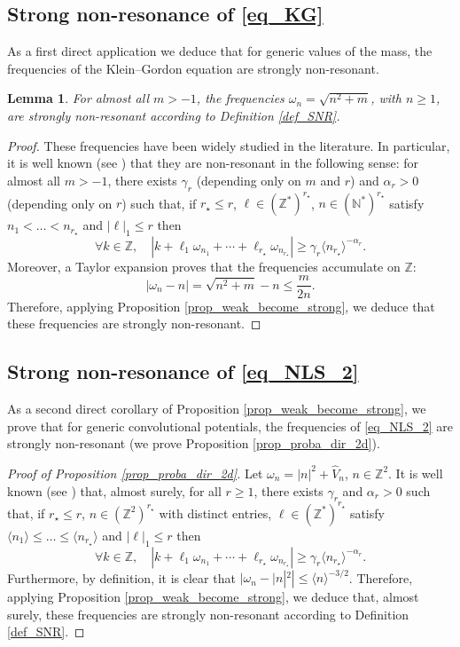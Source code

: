 \documentclass[JEP,XML,SOM,Unicode,NoEqCountersInSection,published]{cedram}
\newtheorem{lemma}[theorem]{Lemma}
\theoremstyle{definition}
\begin{document}
\subsection{Strong non-resonance of \eqref{eq_KG}}
As a first direct application we deduce that for generic values of the mass, the frequencies of the Klein--Gordon equation are strongly non-resonant.
\begin{lemma} \label{lem_nr_KG} For almost all $m>-1$, the frequencies $\omega_n = \sqrt{n^2+m}$, with $n\geq 1$, are strongly non-resonant according to Definition \ref{def_SNR}.
\end{lemma}
\begin{proof}
These frequencies have been widely studied in the literature. In particular, it is well known (see \eg \cite{Bam03,Del09}) that they are non-resonant in the following sense: for almost all $m>-1$, there exists $\gamma_r$ (depending only on $m$ and $r$) and $\alpha_r>0$ (depending only on $r$) such that, if $r_\star \leq r$, $\ell \in (\mathbb{Z}^*)^{r_\star}$, $n \in (\mathbb{N}^*)^{r_\star}$ satisfy $ n_1 < \dots < n_{r_\star} $ and $|\ell|_1 \leq r$ then
\[
\forall k\in \mathbb{Z}, \quad |k+\ell_1 \omega_{n_1}+\cdots+ \ell_{r_\star} \omega_{n_{r_\star}} | \geq \gamma_r \langle n_{r_\star} \rangle^{-\alpha_r}.
\]
Moreover, a Taylor expansion proves that the frequencies accumulate on $\mathbb{Z}$:
\[
|\omega_n - n| = \sqrt{n^2+m} - n \leq \frac{m}{2n}.
\]
Therefore, applying Proposition \ref{prop_weak_become_strong}, we deduce that these frequencies are strongly non-resonant.
\end{proof}

\subsection{Strong non-resonance of \eqref{eq_NLS_2}} As a second direct corollary of Proposition \ref{prop_weak_become_strong}, we prove that for generic convolutional potentials, the frequencies of \eqref{eq_NLS_2} are strongly non-resonant (\ie we prove Proposition \ref{prop_proba_dir_2d}).

\begin{proof}[Proof of Proposition \ref{prop_proba_dir_2d}] Let $\omega_n = |n|^2 + \widehat{V}_n$, $n\in\mathbb{Z}^2$. It is well known (see \eg \cite[Th.\,3.22]{BG06}) that, almost surely, for all $r\geq 1$, there exists $\gamma_r$ and $\alpha_r>0$ such that, if $r_\star \leq r$, $n \in (\mathbb{Z}^2)^{r_\star}$ with distinct entries, $\ell \in (\mathbb{Z}^*)^{r_\star}$ satisfy $ \langle n_1 \rangle \leq \dots \leq \langle n_{r_\star} \rangle $ and $|\ell|_1 \leq r$ then
\[
\forall k\in \mathbb{Z}, \quad |k+\ell_1 \omega_{n_1}+\cdots+ \ell_{r_\star} \omega_{n_{r_\star}} | \geq \gamma_r \langle n_{r_\star} \rangle^{-\alpha_r}.
\]
Furthermore, by definition, it is clear that $
|\omega_n - |n|^2| \leq \langle n \rangle^{-3/2}$. Therefore, applying Proposition \ref{prop_weak_become_strong}, we deduce that, almost surely, these frequencies are strongly non-resonant according to Definition \ref{def_SNR}.
\end{proof}
\end{document}
